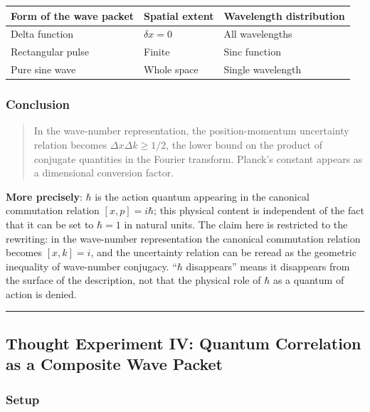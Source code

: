 \documentclass[
]{article}
\newcounter{none} %
\begin{document}
{\def\LTcaptype{none} %
\begin{longtable}[]{@{}lll@{}}
\toprule\noalign{}
Form of the wave packet & Spatial extent & Wavelength distribution \\
\midrule\noalign{}
\endhead
\bottomrule\noalign{}
\endlastfoot
Delta function & \(\delta x = 0\) & All wavelengths \\
Rectangular pulse & Finite & Sinc function \\
Pure sine wave & Whole space & Single wavelength \\
\end{longtable}
}

\subsubsection{Conclusion}\label{conclusion-2}

\begin{quote}
In the wave-number representation, the position-momentum uncertainty
relation becomes \(\Delta x \Delta k \geq 1/2\), the lower bound on the
product of conjugate quantities in the Fourier transform. Planck's
constant appears as a dimensional conversion factor.
\end{quote}

\textbf{More precisely}: \(\hbar\) is the action quantum appearing in
the canonical commutation relation \([x, p] = i\hbar\); this physical
content is independent of the fact that it can be set to \(\hbar = 1\)
in natural units. The claim here is restricted to the rewriting: in the
wave-number representation the canonical commutation relation becomes
\([x, k] = i\), and the uncertainty relation can be reread as the
geometric inequality of wave-number conjugacy. ``\(\hbar\) disappears''
means it disappears from the surface of the description, not that the
physical role of \(\hbar\) as a quantum of action is denied.

\begin{center}\rule{0.5\linewidth}{0.5pt}\end{center}

\subsection{Thought Experiment IV: Quantum Correlation as a Composite
Wave
Packet}\label{thought-experiment-iv-quantum-correlation-as-a-composite-wave-packet}

\subsubsection{Setup}\label{setup-3}
\end{document}
